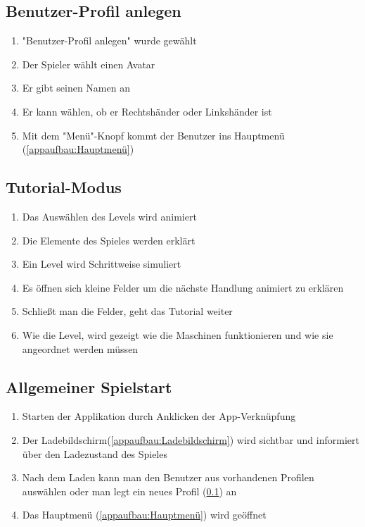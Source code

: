 \documentclass{scrartcl}
\begin{document}
\subsection{Benutzer-Profil anlegen} \label{szenarien:ProfilAnlegen}
	\begin{enumerate}
		\item "Benutzer-Profil anlegen" wurde gewählt
		\item Der Spieler wählt einen Avatar
		\item Er gibt seinen Namen an
		\item Er kann wählen, ob er Rechtshänder oder Linkshänder ist
		\item Mit dem "Menü"-Knopf kommt der Benutzer ins Hauptmenü (\ref{appaufbau:Hauptmenü})
	\end{enumerate}	
	
\subsection{Tutorial-Modus}
	\begin{enumerate}
		\item Das Auswählen des Levels wird animiert
		\item Die Elemente des Spieles werden erklärt
		\item Ein Level wird Schrittweise simuliert
		\item Es öffnen sich kleine Felder um die nächste Handlung animiert zu erklären
		\item Schließt man die Felder, geht das Tutorial weiter
		\item Wie die Level, wird gezeigt wie die Maschinen funktionieren und wie sie angeordnet werden müssen
	\end{enumerate}
	
\subsection{Allgemeiner Spielstart}
	\begin{enumerate}
		\item Starten der Applikation durch Anklicken der App-Verknüpfung
		\item Der Ladebildschirm(\ref{appaufbau:Ladebildschirm}) wird sichtbar und informiert über den Ladezustand des Spieles
		\item Nach dem Laden kann man den Benutzer aus vorhandenen Profilen auswählen oder man legt ein neues Profil (\ref{szenarien:ProfilAnlegen}) an
		\item Das Hauptmenü (\ref{appaufbau:Hauptmenü}) wird geöffnet		
	\end{enumerate}
	
\end{document}
